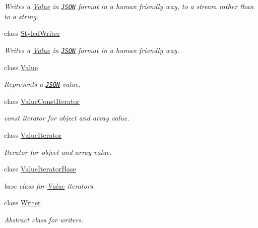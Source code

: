 \begin{DoxyCompactItemize}
\begin{DoxyCompactList}\small\item\em Writes a \hyperlink{classJson_1_1Value}{Value} in \href{http://www.json.org}{\tt J\+S\+ON} format in a human friendly way, to a stream rather than to a string. \end{DoxyCompactList}\item 
class \hyperlink{classJson_1_1StyledWriter}{Styled\+Writer}
\begin{DoxyCompactList}\small\item\em Writes a \hyperlink{classJson_1_1Value}{Value} in \href{http://www.json.org}{\tt J\+S\+ON} format in a human friendly way. \end{DoxyCompactList}\item 
class \hyperlink{classJson_1_1Value}{Value}
\begin{DoxyCompactList}\small\item\em Represents a \href{http://www.json.org}{\tt J\+S\+ON} value. \end{DoxyCompactList}\item 
class \hyperlink{classJson_1_1ValueConstIterator}{Value\+Const\+Iterator}
\begin{DoxyCompactList}\small\item\em const iterator for object and array value. \end{DoxyCompactList}\item 
class \hyperlink{classJson_1_1ValueIterator}{Value\+Iterator}
\begin{DoxyCompactList}\small\item\em Iterator for object and array value. \end{DoxyCompactList}\item 
class \hyperlink{classJson_1_1ValueIteratorBase}{Value\+Iterator\+Base}
\begin{DoxyCompactList}\small\item\em base class for \hyperlink{classJson_1_1Value}{Value} iterators. \end{DoxyCompactList}\item 
class \hyperlink{classJson_1_1Writer}{Writer}
\begin{DoxyCompactList}\small\item\em Abstract class for writers. \end{DoxyCompactList}\end{DoxyCompactItemize}
